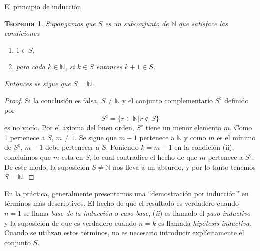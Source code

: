 \documentclass[11pt,spanish,makeidx]{amsbook}
\newtheorem{teorema}{Teorema}[section]
\theoremstyle{definition}
\theoremstyle{remark}
\begin{document}
\begin{section}{El principio de inducción}
\begin{teorema}\label{t1.4} Supongamos que $S$ es un subconjunto de $\mathbb N$ que satisface las condiciones 
\begin{enumerate}
\item[(\em i)] $1 \in S$,
\item[(\em ii)] para cada $k \in \mathbb N$, si $ k \in S$ entonces $k+1\in S$.
\end{enumerate}
Entonces se sigue que $S=\mathbb N$.
\end{teorema}
\begin{proof}Si la conclusión es falsa, $S \not= \mathbb N$ y el conjunto complementario $S^{\text{c}}$ definido por
$$
S^{\text{c}}= \{ r \in \mathbb N | r\not\in S\}
$$
es no vacío. Por el axioma del buen orden, $S^{\text{c}}$ tiene un menor elemento $m$. Como 1 pertenece a $S$, $m\not=1$. Se sigue que $m-1$ pertenece a $\mathbb N$ y como $m$ es el mínimo de $S^{\text{c}}$, $m-1$ debe pertenecer a $S$. Poniendo $k=m-1$ en la condición (ii), concluimos que $m$ esta en $S$, lo cual contradice el hecho de que $m$ pertenece a $S^{\text{c}}$. De este modo, la suposición $S \not= \mathbb N$ nos lleva a un absurdo, y por lo tanto tenemos $S= \mathbb N$.
\end{proof}

En la práctica, generalmente presentamos una ``demostración por inducción'' en términos más descriptivos. El hecho de que el resultado es verdadero cuando $n=1$ se llama {\it base de la inducción} o {\it caso base}, ({\em ii}) es llamado  el {\em paso inductivo} y la suposición de que es verdadero cuando $n=k$ es llamada {\it hipótesis inductiva}. Cuando se utilizan estos términos, no es necesario introducir explícitamente el conjunto $S$.


\end{section}
\end{document}
